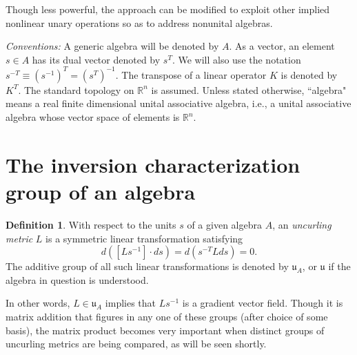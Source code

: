 \documentclass{amsart}
\numberwithin{equation}{section}
\theoremstyle{definition}
\newtheorem{definition}[theorem]{Definition}
\numberwithin{theorem}{section}
\begin{document}
  Though less powerful, the approach can be modified to exploit other implied nonlinear unary operations so as to address nonunital algebras.
  
  \bigskip
  
 {\it Conventions:}    A generic algebra will be denoted by $A$.  As a vector, an element $s\in A$ has its dual vector denoted by $s^T$.  We will also use the notation $s^{-T} \equiv (s^{-1})^T = (s^T)^{-1}$.  The transpose of a linear operator $K$ is denoted by $K^T$.  The standard topology on $\mathbb{R}^n$ is assumed.
        Unless stated otherwise, ``algebra" means a real finite dimensional unital associative algebra, i.e., a unital associative algebra whose vector space of elements is $\mathbb{R}^n$.
 
   
   \section{The inversion characterization group of an algebra}
     
  \begin{definition}\label{7/21/23.1} With respect to the units $s$ of a given algebra $A$, an {\it uncurling metric} $L$ is a symmetric linear transformation  satisfying \begin{equation}\label{4/7/23.1} d([Ls^{-1}]\cdot ds) = d\left(s^{-T} L ds\right) = 0. \end{equation}  The additive group of all such linear transformations is denoted by $\mathfrak{u}_A$, or $\mathfrak{u}$ if the algebra in question is understood. \end{definition}
   
   In other words, $L\in \mathfrak{u}_A$ implies that $Ls^{-1}$ is a gradient vector field.  Though it is matrix addition that figures in any one of these groups (after choice of some basis), the matrix product becomes very important when distinct groups of uncurling metrics are being compared, as will be seen shortly.
   
\end{document}
